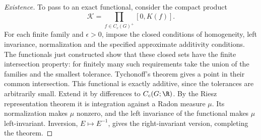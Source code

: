 \begin{proof}[Existence]
To pass to an exact functional, consider the compact product
\[
 \mathcal K=\prod_{f\in C_c(G)^+}[0,K(f)].
\]
For each finite family and $\epsilon>0$, impose the closed conditions of
homogeneity, left invariance, normalization and the specified approximate
additivity conditions. The functionals just constructed show that these
closed sets have the finite intersection property: for finitely many such
requirements take the union of the families and the smallest tolerance.
Tychonoff's theorem gives a point in their common intersection. This
functional is exactly additive, since the tolerances are arbitrarily small.
Extend it by differences to $C_c(G;\R)$. By the Riesz representation theorem
it is integration against a Radon measure $\mu$. Its normalization makes
$\mu$ nonzero, and the left invariance of the functional makes $\mu$
left-invariant. Inversion, $E\mapsto E^{-1}$, gives the right-invariant
version, completing the theorem.
\end{proof}
